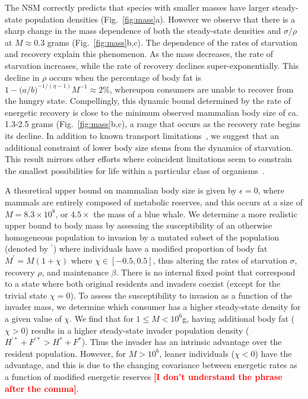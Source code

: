 \documentclass{pnastwo}
\newcommand{\sid}[1]{\textcolor{red}{\bf [#1]}}
\begin{document}
\begin{article}
The NSM correctly predicts that species with
smaller masses have larger steady-state population densities (Fig.~\ref{fig:mass}a).  However we
observe that there is a sharp change in the mass dependence of both the
steady-state densities and $\sigma/\rho$ at $M \approx 0.3$ grams
(Fig.~\ref{fig:mass}b,c).  The dependence of the rates of starvation and
recovery explain this phenomenon.  As the mass decreases, the rate of
starvation increases, while the rate of recovery declines super-exponentially.  This decline in $\rho$ occurs when the
percentage of body fat is
$1 - \big(a/b\big)^{-1/\left(\eta-1\right)}M^{-1} \approx
2\%$,
whereupon consumers are unable to recover from the hungry state.  Compellingly, this dynamic bound determined by the rate of
energetic recovery is close to the minimum observed mammalian body size of
ca. 1.3-2.5 grams (Fig.~\ref{fig:mass}b,c), a range that occurs as the
recovery rate begins its decline.  In addition to known transport
limitations~\cite{West:2002ud}, we suggest that an additional constraint of
lower body size stems from the dynamics of starvation.  This result mirrors other efforts where coincident limitations seem to constrain the
smallest possibilities for life within a particular class of
organisms~\cite{Kempes:2012hy}.

A theoretical upper bound on mammalian body size is given by $\epsilon=0$, where mammals are entirely composed of metabolic reserves, and this occurs at a size of $M=8.3\times 10^8$, or $4.5\times$ the mass of a blue whale.
We determine a more realistic upper bound to body mass by assessing the
susceptibility of an otherwise homogeneous population to invasion by a
mutated subset of the population (denoted by ${}^\prime$) where individuals
have a modified proportion of body fat $M^\prime=M(1+\chi)$ where
$\chi \in [-0.5,0.5]$, thus altering the rates of starvation $\sigma$,
recovery $\rho$, and maintenance $\beta$.  There is no internal fixed point
that correspond to a state where both original residents and invaders coexist
(except for the trivial state $\chi=0$).  To assess the susceptibility to
invasion as a function of the invader mass, we determine which consumer has a
higher steady-state density for a given value of $\chi$.  We find that for
$1\leq M<10^6$g, having additional body fat ($\chi > 0$) results in a higher
steady-state invader population density
($H^{\prime *}+F^{\prime *}>H^*+F^*$).  Thus the invader has an intrinsic
advantage over the resident population.  However, for $M>10^6$, leaner
individuals ($\chi < 0$) have the advantage, and this is due to the changing
covariance between energetic rates as a function of modified energetic
reserves \sid{I don't understand the phrase after the comma}.


\end{article}
\end{document}
